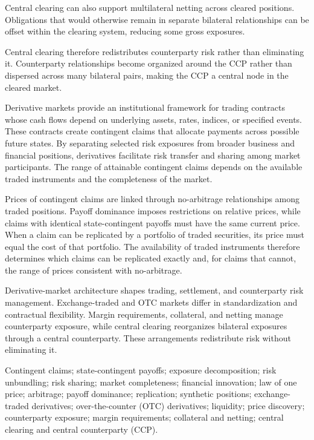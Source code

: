 Central clearing can also support multilateral netting across cleared positions. Obligations that would otherwise remain in separate bilateral relationships can be offset within the clearing system, reducing some gross exposures.

Central clearing therefore redistributes counterparty risk rather than eliminating it. Counterparty relationships become organized around the CCP rather than dispersed across many bilateral pairs, making the CCP a central node in the cleared market.



Derivative markets provide an institutional framework
for trading contracts whose cash flows depend on
underlying assets, rates, indices, or specified
events. These contracts create contingent claims
that allocate payments across possible future states.
By separating selected risk exposures from broader
business and financial positions, derivatives
facilitate risk transfer and sharing among market
participants. The range of attainable contingent
claims depends on the available traded instruments
and the completeness of the market.

Prices of contingent claims are linked through
no-arbitrage relationships among traded positions.
Payoff dominance imposes restrictions on relative
prices, while claims with identical state-contingent
payoffs must have the same current price. When a
claim can be replicated by a portfolio of traded
securities, its price must equal the cost of that
portfolio. The availability of traded instruments
therefore determines which claims can be replicated
exactly and, for claims that cannot, the range of
prices consistent with no-arbitrage.

Derivative-market architecture shapes trading,
settlement, and counterparty risk management.
Exchange-traded and OTC markets differ in
standardization and contractual flexibility.
Margin requirements, collateral, and netting
manage counterparty exposure, while central
clearing reorganizes bilateral exposures through
a central counterparty. These arrangements
redistribute risk without eliminating it.


Contingent claims; state-contingent payoffs;
exposure decomposition; risk unbundling; risk sharing;
market completeness; financial innovation;
law of one price; arbitrage; payoff dominance;
replication; synthetic positions;
exchange-traded derivatives; over-the-counter (OTC)
derivatives; liquidity; price discovery;
counterparty exposure; margin requirements;
collateral and netting; central clearing and
central counterparty (CCP).

